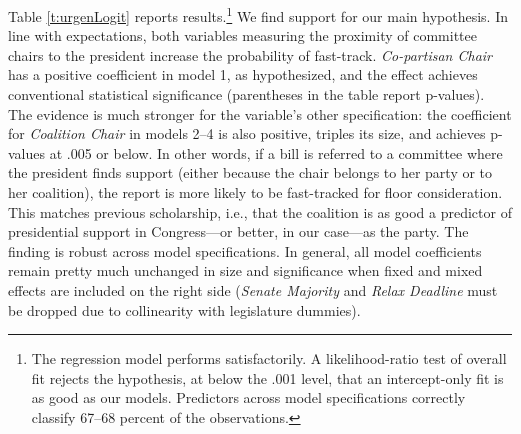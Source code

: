 \documentclass[letter,12pt]{article}
\begin{document}
Table \ref{t:urgenLogit} reports results.\footnote{The regression model performs satisfactorily. A likelihood-ratio test of overall fit rejects the hypothesis, at below the .001 level, that an intercept-only fit is as good as our models. Predictors across model specifications correctly classify 67--68 percent of the observations.} We find support for our main hypothesis. In line with expectations, both variables measuring the proximity of committee chairs to the president increase the probability of fast-track. \emph{Co-partisan Chair} has a positive coefficient in model 1, as hypothesized, and the effect achieves conventional statistical significance (parentheses in the table report p-values). The evidence is much stronger for the variable's other specification: the coefficient for \emph{Coalition Chair} in models 2--4 is also positive, triples its size, and achieves p-values at .005 or below. In other words, if a bill is referred to a committee where the president finds support (either because the chair belongs to her party or to her coalition), the report is more likely to be fast-tracked for floor consideration. This matches previous scholarship, i.e., that the coalition is as good a predictor of presidential support in Congress---or better, in our case---as the party. The finding is robust across model specifications. In general, all model coefficients remain pretty much unchanged in size and significance when fixed and mixed effects are included on the right side (\emph{Senate Majority} and \emph{Relax Deadline} must be dropped due to collinearity with legislature dummies). 

\end{document}
